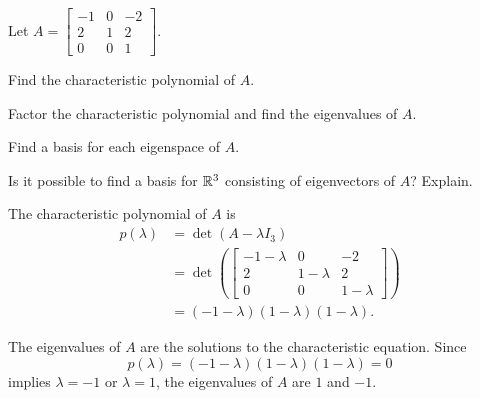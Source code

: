  
\label{sec:chareq_exam}

\ExampleIntro

\begin{example} Let $A = \left[ \begin{array}{rcr} -1&0&-2 \\ 2&1&2 \\ 0&0&1 \end{array}\right]$. 
\ba
\item Find the characteristic polynomial of $A$. 

\item Factor the characteristic polynomial and find the eigenvalues of $A$. 

\item Find a basis for each eigenspace of $A$. 

\item Is it possible to find a basis for $\mathbb{R}^3$ consisting of eigenvectors of $A$? Explain. 

\ea


\ExampleSolution
\ba
\item The characteristic polynomial of $A$ is 
\begin{align*}
p(\lambda) &= \det(A - \lambda I_3) \\
	&= \det\left( \left[ \begin{array}{ccc} -1-\lambda&0&-2 \\ 2&1-\lambda&2 \\ 0&0&1-\lambda \end{array}\right] \right) \\
	&= (-1-\lambda)(1-\lambda)(1-\lambda).
\end{align*}

\item The eigenvalues of $A$ are the solutions to the characteristic equation. Since 
\[p(\lambda) = (-1-\lambda)(1-\lambda)(1-\lambda) = 0\]
implies $\lambda = -1$ or $\lambda = 1$, the eigenvalues of $A$ are $1$ and $-1$.


\end{example}
